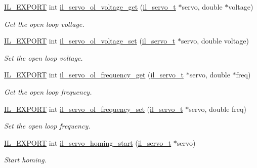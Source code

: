\begin{DoxyCompactItemize}
\hyperlink{common_8h_a6bb629d26c52bfe10519ba3176853f47}{I\+L\+\_\+\+E\+X\+P\+O\+RT} int \hyperlink{group__IL__SERVO_ga245d1c9ecdbee76adff2b79757ebf158}{il\+\_\+servo\+\_\+ol\+\_\+voltage\+\_\+get} (\hyperlink{group__IL__SERVO_ga3369ddfcc33492fe3a28f96cf455b13e}{il\+\_\+servo\+\_\+t} $\ast$servo, double $\ast$voltage)
\begin{DoxyCompactList}\small\item\em Get the open loop voltage. \end{DoxyCompactList}\item 
\hyperlink{common_8h_a6bb629d26c52bfe10519ba3176853f47}{I\+L\+\_\+\+E\+X\+P\+O\+RT} int \hyperlink{group__IL__SERVO_ga3aec778ff294237e8e32a651ec8e215d}{il\+\_\+servo\+\_\+ol\+\_\+voltage\+\_\+set} (\hyperlink{group__IL__SERVO_ga3369ddfcc33492fe3a28f96cf455b13e}{il\+\_\+servo\+\_\+t} $\ast$servo, double voltage)
\begin{DoxyCompactList}\small\item\em Set the open loop voltage. \end{DoxyCompactList}\item 
\hyperlink{common_8h_a6bb629d26c52bfe10519ba3176853f47}{I\+L\+\_\+\+E\+X\+P\+O\+RT} int \hyperlink{group__IL__SERVO_ga190f42e03d0a1255efd92df375690f02}{il\+\_\+servo\+\_\+ol\+\_\+frequency\+\_\+get} (\hyperlink{group__IL__SERVO_ga3369ddfcc33492fe3a28f96cf455b13e}{il\+\_\+servo\+\_\+t} $\ast$servo, double $\ast$freq)
\begin{DoxyCompactList}\small\item\em Get the open loop frequency. \end{DoxyCompactList}\item 
\hyperlink{common_8h_a6bb629d26c52bfe10519ba3176853f47}{I\+L\+\_\+\+E\+X\+P\+O\+RT} int \hyperlink{group__IL__SERVO_ga7032da0b86cc1f6b139f10993c567b8a}{il\+\_\+servo\+\_\+ol\+\_\+frequency\+\_\+set} (\hyperlink{group__IL__SERVO_ga3369ddfcc33492fe3a28f96cf455b13e}{il\+\_\+servo\+\_\+t} $\ast$servo, double freq)
\begin{DoxyCompactList}\small\item\em Set the open loop frequency. \end{DoxyCompactList}\item 
\hyperlink{common_8h_a6bb629d26c52bfe10519ba3176853f47}{I\+L\+\_\+\+E\+X\+P\+O\+RT} int \hyperlink{group__IL__SERVO_gaf7cf26ed91ae60e5f049b056009783e0}{il\+\_\+servo\+\_\+homing\+\_\+start} (\hyperlink{group__IL__SERVO_ga3369ddfcc33492fe3a28f96cf455b13e}{il\+\_\+servo\+\_\+t} $\ast$servo)
\begin{DoxyCompactList}\small\item\em Start homing. \end{DoxyCompactList}\item 

\end{DoxyCompactItemize}
